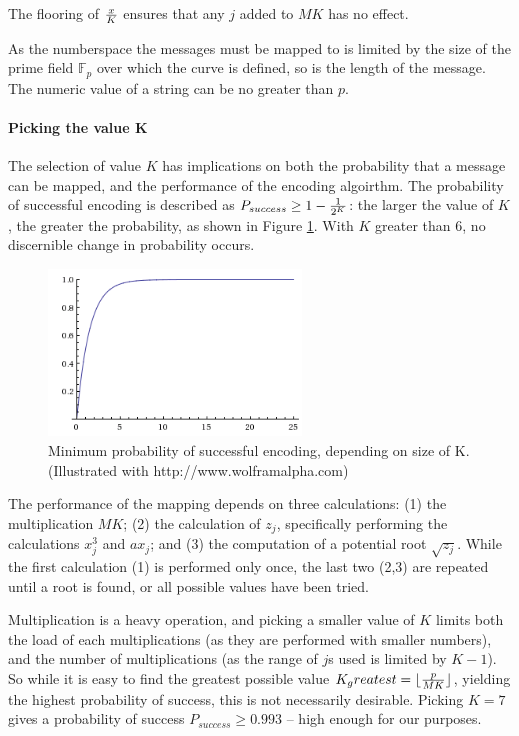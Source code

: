 The flooring of \(x \over K\) ensures that any \(j\) added to \(MK\) has no effect.\cite{MappingAMessage}

As the numberspace the messages must be mapped to is limited by the size of the prime field \(\mathbb{F}_p\) over which the curve is defined, so is the
length of the message. The numeric value of a string can be no greater than \(p\).

\paragraph{Picking the value K}

The selection of value \(K\) has implications on both the probability that a message can be mapped, and the performance of the encoding algoirthm.
The probability of successful encoding is described as \(P_{success} \geq 1 - {1 \over {2^K}}\): the larger the value of \(K\), the greater the probability,
as shown in Figure \ref{fig:probability}. With \(K\) greater than 6, no discernible change in probability occurs.\cite{MappingAMessage}

\begin{figure}[htb]
	\centering
	\includegraphics[width=0.6\textwidth]{maths/encoding-probability}
	\caption{Minimum probability of successful encoding, depending on size of K. (Illustrated with http://www.wolframalpha.com)}
	\label{fig:probability}
\end{figure}

The performance of the mapping depends on three calculations: (1) the multiplication \(MK\); (2) the calculation of \(z_j\), specifically
performing the calculations \(x_j^3\) and \(ax_j\); and (3) the computation of a potential root \(\sqrt{z_j}\). While the first calculation (1)
is performed only once, the last two (2,3) are repeated until a root is found, or all possible values have been tried.

Multiplication is a heavy operation, and picking a smaller value of \(K\) limits both the load of each multiplications (as they are performed with
smaller numbers), and the number of multiplications (as the range of \(j\)s used is limited by \(K - 1\)). So while it is easy to find the greatest
possible value \(K_greatest = {\lfloor { p \over {MK} }\rfloor}\), yielding the highest probability of success, this is not necessarily desirable.
Picking \(K = 7\) gives a probability of success \(P_{success} \geq 0.993\) -- high enough for our purposes.